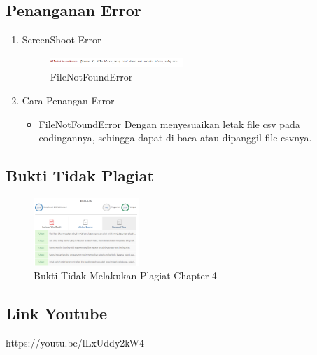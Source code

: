 \subsection{Penanganan Error}
\begin{enumerate}
	\item ScreenShoot Error
	\begin{figure}[H]
		\includegraphics[width=5cm]{figures/1174087/4/error.png}
		\centering
		\caption{FileNotFoundError}
	\end{figure}
	\item Cara Penangan Error
	\begin{itemize}
		\item FileNotFoundError
		\hfill\break
		Dengan menyesuaikan letak file csv pada codingannya, sehingga dapat  di baca atau dipanggil file csvnya.
	\end{itemize}
\end{enumerate}

\subsection{Bukti Tidak Plagiat}
\begin{figure}[H]
\centering
	\includegraphics[width=4cm]{figures/1174087/4/plagiat.png}
	\caption{Bukti Tidak Melakukan Plagiat Chapter 4}
\end{figure}

\subsection{Link Youtube}
https://youtu.be/lLxUddy2kW4
